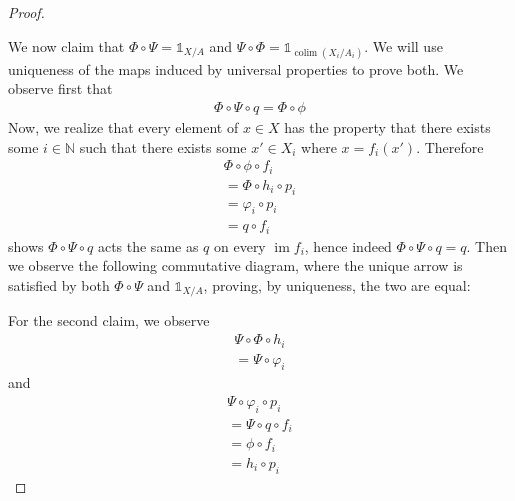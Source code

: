 \documentclass{article}
\newcommand{\N}{\mathbb{N}}
\DeclareMathOperator{\im}{im}
\DeclareMathOperator{\colim}{colim}
\newcommand{\altid}{\mathds{1}}
\begin{document}
\begin{proof}
    \begin{center}
    \end{center}
    We now claim that $\Phi\circ \Psi=\altid_{X/A}$ and $\Psi \circ \Phi=\altid_{\colim (X_i/A_i)}$. We will use uniqueness of the maps induced by universal properties to prove both. We observe first that
    \begin{align*}
        \Phi \circ \Psi \circ q=\Phi \circ \phi
    \end{align*}
    Now, we realize that every element of $x\in X$ has the property that there exists some $i\in \N$ such that there exists some $x'\in X_i$ where $x=f_i(x')$. Therefore 
    \begin{align*}
        \Phi \circ \phi \circ f_i\\
        =\Phi \circ h_i\circ p_i\\
        =\varphi_i \circ p_i\\
        =q\circ f_i
    \end{align*}
    shows $\Phi\circ \Psi\circ q$ acts the same as $q$ on every $\im f_i$, hence indeed $\Phi \circ \Psi \circ q=q$. Then we observe the following commutative diagram, where the unique arrow is satisfied by both $\Phi \circ \Psi$ and $\altid_{X/A}$, proving, by uniqueness, the two are equal:
    \begin{center}
    \end{center}
    For the second claim, we observe
    \begin{align*}
        \Psi \circ \Phi \circ h_i\\
        =\Psi \circ \varphi_i
    \end{align*}
    and
    \begin{align*}
        \Psi \circ \varphi_i \circ p_i\\
        =\Psi \circ q\circ f_i\\
        =\phi \circ f_i\\
        =h_i\circ p_i
    \end{align*}

\end{proof}
\end{document}
